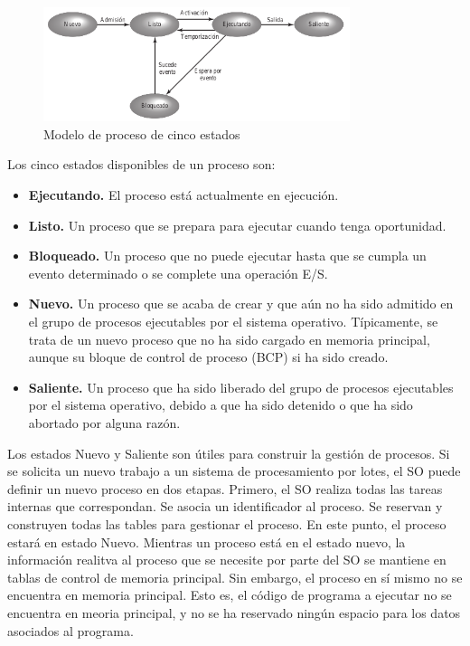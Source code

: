 \documentclass{article}
\begin{document}
				\begin{figure}
				\caption{Modelo de proceso de cinco estados}
				\label{figura2.4:cinco estados}
				\centering
				\includegraphics[width=0.8\textwidth, scale=1]{tema_2_figura4.png}
				\end{figure}
				
				Los cinco estados disponibles de un proceso son: 
				\begin{itemize}
				\item \textbf{Ejecutando.} El proceso está actualmente en ejecución.
				\item \textbf{Listo.} Un proceso que se prepara para ejecutar cuando tenga oportunidad.
				\item \textbf{Bloqueado.} Un proceso que no puede ejecutar hasta que se cumpla un evento determinado o
se complete una operación E/S.
				\item \textbf{Nuevo.} Un proceso que se acaba de crear y que aún no ha sido admitido en el grupo de procesos ejecutables por el sistema operativo. Típicamente, se trata de un nuevo proceso que no ha
sido cargado en memoria principal, aunque su bloque de control de proceso (BCP) si ha sido creado.
				\item \textbf{Saliente.} Un proceso que ha sido liberado del grupo de procesos ejecutables por el sistema operativo, debido a que ha sido detenido o que ha sido abortado por alguna razón.
				\end{itemize}
									
				Los estados Nuevo y Saliente son útiles para construir la gestión de procesos. Si se solicita un nuevo trabajo a un sistema de procesamiento por lotes, el SO puede definir un nuevo proceso en dos etapas. Primero, el SO realiza todas las tareas internas que correspondan. Se asocia un identificador al proceso. Se reservan y construyen todas las tables para gestionar el proceso. En este punto, el proceso estará en estado Nuevo. Mientras un proceso está en el estado nuevo, la información realitva al proceso que se necesite por parte del SO se mantiene en tablas de control de memoria principal. Sin embargo, el proceso en sí mismo no se encuentra en memoria principal. Esto es, el código de programa a ejecutar no se encuentra en meoria principal, y no se ha reservado ningún espacio para los datos asociados al programa. \\
				
\end{document}
